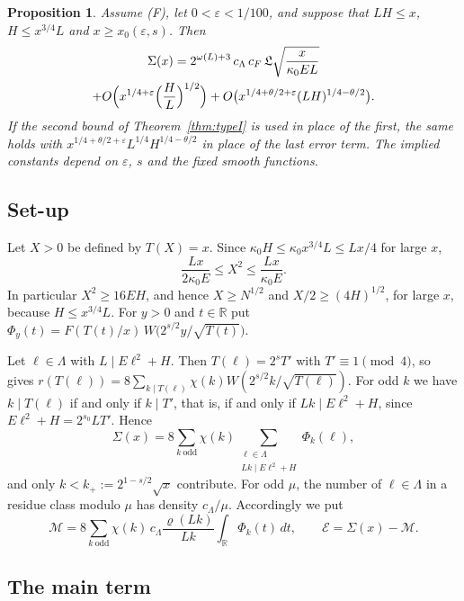 \documentclass[11pt]{amsart}
\newtheorem{proposition}[theorem]{Proposition}
\theoremstyle{remark}
\theoremstyle{definition}
\numberwithin{equation}{section}
\newcommand{\R}{\mathbb{R}}
\newcommand{\eps}{\varepsilon}
\newcommand{\Lf}{\mathfrak{L}}
\newcommand{\Ec}{\mathcal{E}}
\newcommand{\Mt}{\mathcal{M}}
\begin{document}
\begin{proposition}\label{prop:count}
Assume \textup{(F)}, let $0<\eps<1/100$, and suppose that $LH\le x$, $H\le x^{3/4}L$ and $x\ge x_0(\eps,s)$. Then
\begin{multline*}
\Sigma(x)=2^{\omega(L)+3}\,c_\Lambda\,c_F\,\Lf\sqrt{\frac{x}{\kappa_0EL}}\\
+O\Bigl(x^{1/4+\eps}\Bigl(\frac HL\Bigr)^{1/2}\Bigr)+O\bigl(x^{1/4+\theta/2+\eps}(LH)^{1/4-\theta/2}\bigr).
\end{multline*}
If the second bound of Theorem~\ref{thm:typeI} is used in place of the first, the same holds with $x^{1/4+\theta/2+\eps}L^{1/4}H^{1/4-\theta/2}$ in place of the last error term. The implied constants depend on $\eps$, $s$ and the fixed smooth functions.
\end{proposition}

\subsection{Set-up}
Let $X>0$ be defined by $T(X)=x$. Since $\kappa_0H\le\kappa_0x^{3/4}L\le Lx/4$ for large $x$,
\begin{equation}\label{eq:Xsize}
\frac{Lx}{2\kappa_0E}\le X^2\le\frac{Lx}{\kappa_0E}.
\end{equation}
In particular $X^2\ge16EH$, and hence $X\ge N^{1/2}$ and $X/2\ge(4H)^{1/2}$, for large $x$, because $H\le x^{3/4}L$. For $y>0$ and $t\in\R$ put $\Phi_y(t)=F(T(t)/x)\,W\bigl(2^{s/2}y/\sqrt{T(t)}\bigr)$.

Let $\ell\in\Lambda$ with $L\mid E\ell^2+H$. Then $T(\ell)=2^sT'$ with $T'\equiv1\pmod4$, so \cite[Lemma~5.1]{IC} gives $r(T(\ell))=8\sum_{k\mid T(\ell)}\chi(k)W(2^{s/2}k/\sqrt{T(\ell)})$. For odd $k$ we have $k\mid T(\ell)$ if and only if $k\mid T'$, that is, if and only if $Lk\mid E\ell^2+H$, since $E\ell^2+H=2^{s_0}LT'$. Hence
\begin{equation}\label{eq:Sigma2}
\Sigma(x)=8\sum_{k\ \mathrm{odd}}\chi(k)\sum_{\substack{\ell\in\Lambda\\ Lk\mid E\ell^2+H}}\Phi_k(\ell),
\end{equation}
and only $k<k_+:=2^{1-s/2}\sqrt x$ contribute. For odd $\mu$, the number of $\ell\in\Lambda$ in a residue class modulo $\mu$ has density $c_\Lambda/\mu$. Accordingly we put
\[
\Mt=8\sum_{k\ \mathrm{odd}}\chi(k)\,c_\Lambda\frac{\varrho(Lk)}{Lk}\int_\R\Phi_k(t)\,dt,\qquad\Ec=\Sigma(x)-\Mt.
\]

\subsection{The main term}
\end{document}
